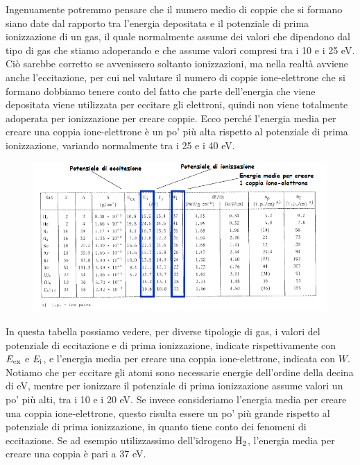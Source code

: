 Ingenuamente potremmo pensare che il numero medio di coppie che si formano siano date dal rapporto tra l'energia depositata e il potenziale di prima ionizzazione di un gas, il quale normalmente assume dei valori che dipendono dal tipo di gas che stiamo adoperando e che assume valori compresi tra i 10 e i 25 eV. Ciò sarebbe corretto se avvenissero soltanto ionizzazioni, ma nella realtà avviene anche l'eccitazione, per cui nel valutare il numero di coppie ione-elettrone che si formano dobbiamo tenere conto del fatto che parte dell'energia che viene depositata viene utilizzata per eccitare gli elettroni, quindi non viene totalmente adoperata per ionizzazione per creare coppie. Ecco perché l'energia media per creare una coppia ione-elettrone è un po' più alta rispetto al potenziale di prima ionizzazione, variando normalmente tra i 25 e i 40 eV.

\begin{figure}[H]
   \centering
   \includegraphics[width=\textwidth]{immagini/potenziali_ionizzazione.png}
\end{figure}

In questa tabella possiamo vedere, per diverse tipologie di gas, i valori del potenziale di eccitazione e di prima ionizzazione, indicate rispettivamente con $E_{\rm ex}$ e $E_{\rm i}$, e l'energia media per creare una coppia ione-elettrone, indicata con $W$. Notiamo che per eccitare gli atomi sono necessarie energie dell'ordine della decina di eV, mentre per ionizzare il potenziale di prima ionizzazione assume valori un po' più alti, tra i 10 e i 20 eV. Se invece consideriamo l'energia media per creare una coppia ione-elettrone, questo risulta essere un po' più grande rispetto al potenziale di prima ionizzazione, in quanto tiene conto dei fenomeni di eccitazione. Se ad esempio utilizzassimo dell'idrogeno $\rm H_2$, l'energia media per creare una coppia è pari a 37 eV.

